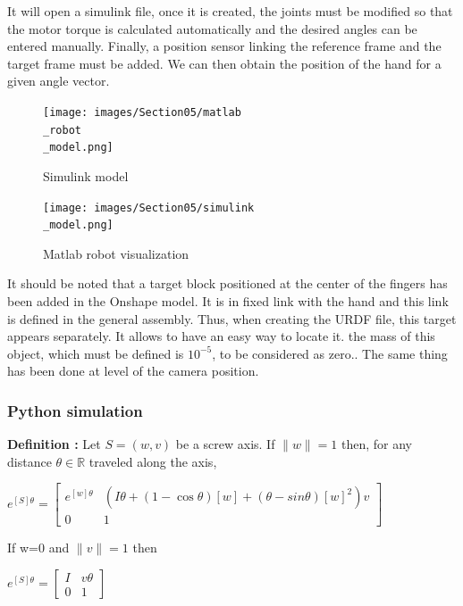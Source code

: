 \bigbreak
It will open a simulink file, once it is created, the joints must be modified so that the motor torque is calculated automatically and the desired angles can be entered manually. Finally, a position sensor linking the reference frame and the target frame must be added. We can then obtain the position of the hand for a given angle vector. 

\bigbreak
\begin{figure}[ht]
    \centering
    \texttt{[image: images/Section05/matlab\\\_robot\\\_model.png]}
    \caption{Simulink model}
    \label{fig:mesh12}
\end{figure}
\FloatBarrier

\bigbreak
\begin{figure}[ht]
    \centering
    \texttt{[image: images/Section05/simulink\\\_model.png]}
    \caption{Matlab robot visualization}
    \label{fig:mesh13}
\end{figure}
\FloatBarrier

\bigbreak
It should be noted that a target block positioned at the center of the fingers has been added in the Onshape model. It is in fixed link with the hand and this link is defined in the general assembly. Thus, when creating the URDF file, this target appears separately. It allows to have an easy way to locate it. the mass of this object, which must be defined is $10^{-5}$, to be considered as zero.. The same thing has been done at level of the camera position. 

\subsubsection{Python simulation}

\textbf{Definition :} Let $S = (w,v)$ be a screw axis. If $\|w\|=1$ then, for any distance $\theta\in\mathbb{R}$ traveled along the axis,
\begin{center}
    $e^{[S]\theta}=
    \begin{bmatrix}
        e^{[w]\theta} & (I\theta+(1-\cos\theta)[w]+(\theta-sin\theta)[w]^2)v\\
        0 & 1
    \end{bmatrix}$
\end{center}
If w=0 and $\|v\|=1$ then 
\begin{center}
    $e^{[S]\theta}=\begin{bmatrix}
        I & v\theta\\
        0 & 1
    \end{bmatrix}$
\end{center}

